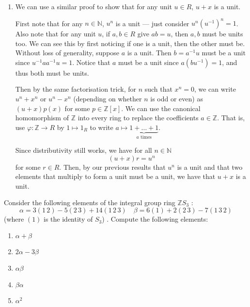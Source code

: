 \documentclass[12 pt, letterpaper]{hmcpset}
\begin{document}
\begin{solution}
\begin{enumerate}
\[\begin{split}
										      & = 1 - 0 \\
										      & = 1
				\end{split}
			\]
			for $n$ even and
			\[
				\begin{split}
					(1 + x)(x^{n - 1} - x^{n - 2} + \dots + x^{2} - x + 1) & = 1 + x^{n} \\
											       & = 1 + 0 \\
											       & = 1
				\end{split}
			\]
			for $n$ odd. Thus, we have that $1 + x$ is a unit in both cases.
		\item We can use a similar proof to show that for any unit $u \in R$, $u + x$ is a unit. 
			
			First note that for any $n \in \mathbb{N}$, $u^{n}$ is a unit --- just consider $u^{n} (u^{-1})^{n} = 1$. Also note that for any unit $u$, if $a, b \in R$ give $ab = u$, then $a, b$ must be units too. We can see this by first noticing if one is a unit, then the other must be. Without loss of generality, suppose $a$ is a unit. Then $b = a^{-1} u$ must be a unit since $u^{-1} a a^{-1} u = 1$. Notice that $a$ must be a unit since $a (b u^{-1}) = 1$, and thus both must be units. 
			
			Then by the same factorisation trick, for $n$ such that $x^{n} = 0$, we can write $u^{n} + x^{n}$ or $u^{n} - x^{n}$ (depending on whether $n$ is odd or even) as $(u + x) p(x)$ for some $p \in \mathbb{Z}[x]$. We can use the canonical homomorphism of $\mathbb{Z}$ into every ring to replace the coefficients $a \in \mathbb{Z}$. That is, use $\varphi : \mathbb{Z} \to R$ by $1 \mapsto 1_{R}$ to write $a \mapsto \underbrace{1 + \dots + 1}_{a \text{ times}}$. 
			
			Since distributivity still works, we have for all $n \in \mathbb{N}$
			\[
				(u + x) r = u^{n}
			\]
			for some $r \in R$. Then, by our previous results that $u^{n}$ is a unit and that two elements that multiply to form a unit must be a unit, we have that $u + x$ is a unit.
	\end{enumerate}
\end{solution}

\pagebreak

\begin{problem}
	Consider the following elements of the integral group ring $\mathbb{Z} S_{3}$ :
	\[
		\alpha = 3 (1 \, 2) - 5 (2 \, 3) + 14 (1 \, 2 \, 3) \quad \beta = 6 (1) + 2 (2 \, 3) - 7 (1 \, 3 \, 2)
	\]
	(where $(1)$ is the identity of $S_{3}$) . Compute the following elements:
	\begin{enumerate}
		\item $\alpha + \beta$
		\item $2 \alpha - 3 \beta$
		\item $\alpha \beta$
		\item $\beta \alpha$
		\item $\alpha^{2}$
	\end{enumerate}
\end{problem}
\end{document}

